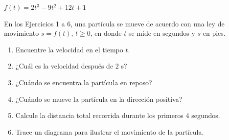 \item $f(t) = 2t^3 - 9t^2 + 12t + 1$
\par
En los Ejercicios 1 a 6, una partícula se mueve de acuerdo con una ley de movimiento $s = f(t)$, $t \ge 0$, en donde $t$ se mide en segundos y $s$ en pies.
\begin{enumerate}
    \item[(a)] Encuentre la velocidad en el tiempo $t$.
    \item[(b)] ¿Cuál es la velocidad después de 2 s?
    \item[(c)] ¿Cuándo se encuentra la partícula en reposo?
    \item[(d)] ¿Cuándo se mueve la partícula en la dirección positiva?
    \item[(e)] Calcule la distancia total recorrida durante los primeros 4 segundos.
    \item[(f)] Trace un diagrama para ilustrar el movimiento de la partícula.
\end{enumerate}

